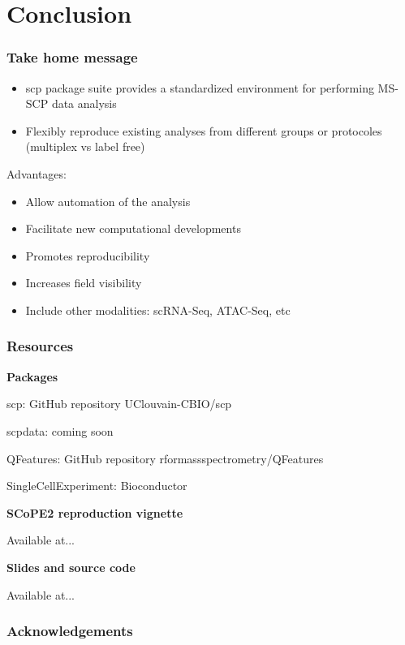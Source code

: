 \documentclass{beamer}
\newcommand{\hcode}[2][lgray]{{\ttfamily\color{vdgray}\colorbox{#1}{#2}}}
\newcommand{\frametitlesection}[1]{\frametitle{\centering #1 \footnotesize \hspace{0pt plus 1 filll} \insertsection}}
\begin{document}

\section{Conclusion}

\begin{frame}
    \frametitlesection{Take home message}
    
    \begin{itemize}
        \item{\hcode{scp} package suite provides a standardized environment for 
        performing MS-SCP data analysis}
        \item{Flexibly reproduce existing analyses from different groups or 
        protocoles (multiplex vs label free)}
    \end{itemize}
    
    \bigskip
    
    Advantages:
    
    \begin{itemize}
        \item{Allow automation of the analysis}
        \item{Facilitate new computational developments}
        \item{Promotes reproducibility}
        \item{Increases field visibility}
        \item{Include other modalities: scRNA-Seq, ATAC-Seq, etc}
    \end{itemize}
    
\end{frame}

\begin{frame}
    \frametitlesection{Resources}
    
    \textbf{Packages}
    
    \begin{itemize}
        \item{\hcode{scp}: GitHub repository \hcode{UClouvain-CBIO/scp}}
        \item{\hcode{scpdata}: coming soon
        \item{\hcode{QFeatures}: GitHub repository \hcode{rformassspectrometry/QFeatures}}
        \item{\hcode{SingleCellExperiment}: Bioconductor}}
    \end{itemize}
    
    \bigskip
    
    \textbf{SCoPE2 reproduction vignette}
    
    Available at...
    
    \bigskip
    
    \textbf{Slides and source code}
    
    Available at...
    
\end{frame}

\begin{frame}
    \frametitlesection{Acknowledgements}
    
\end{frame}
\end{document}
